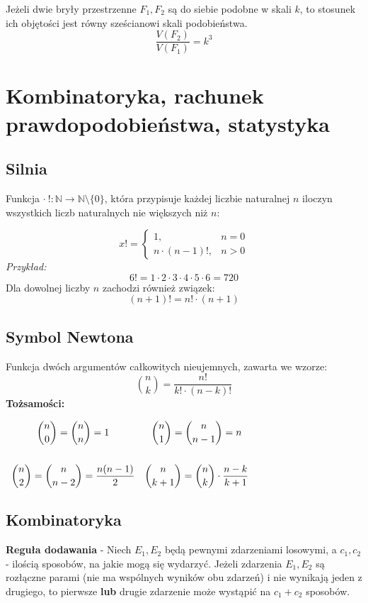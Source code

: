 \documentclass[14pt,a4paper]{extarticle}
\begin{document}
\noindent Jeżeli dwie bryły przestrzenne $F_{1}, F_{2}$ są do siebie podobne w skali $k$, to stosunek
ich objętości jest równy sześcianowi skali podobieństwa.
$$\dfrac{V(F_{2})}{V(F_{1})}=k^{3}$$

\newpage
\section{Kombinatoryka, rachunek prawdopodobieństwa, statystyka}
\subsection{Silnia} Funkcja $\cdot\: !: \mathbb{N} \rightarrow \mathbb{N}\setminus\{0\}$, która przypisuje każdej
liczbie naturalnej $n$ iloczyn wszystkich liczb naturalnych nie większych niż $n$:

\begin{equation*}
   x! = \left\{
      \begin{array}{ll}
         1, & n = 0 \\
         n\cdot (n-1)!, & n > 0
      \end{array}
   \right.
\end{equation*}
\noindent \textit{Przykład:}
$$6! = 1\cdot 2\cdot 3\cdot 4\cdot 5\cdot 6 = 720$$
\noindent Dla dowolnej liczby $n$ zachodzi również związek:
\[(n+1)! = n!\cdot(n+1)\]

\subsection{Symbol Newtona}
Funkcja dwóch argumentów całkowitych nieujemnych, zawarta we wzorze:
$$\binom{n}{k} = \dfrac{n!}{k!\cdot (n-k)!}$$
\noindent\textbf{Tożsamości:}
\begin{center}
   \(
   \begin{array}{cc}
      \dbinom{n}{0} = \dbinom{n}{n} = 1 & \dbinom{n}{1} = \dbinom{n}{n-1} = n\\[0.9cm]
      \dbinom{n}{2} = \dbinom{n}{n-2} = \dfrac{n(n-1)}{2} & \dbinom{n}{k+1} = \dbinom{n}{k}\cdot \dfrac{n-k}{k+1}\\
   \end{array}
   \)

\end{center}

\subsection{Kombinatoryka}
\noindent\textbf{Reguła dodawania} - Niech $E_{1}, E_{2}$ będą pewnymi zdarzeniami losowymi, a
$c_{1}, c_{2}$ - ilością sposobów, na jakie mogą się wydarzyć. Jeżeli zdarzenia $E_{1}, E_{2}$
są rozłączne parami (nie ma wspólnych wyników obu zdarzeń) i nie wynikają jeden z drugiego,
to pierwsze \textbf{lub} drugie zdarzenie może wystąpić na $c_{1} + c_{2}$ sposobów.\\
\end{document}
